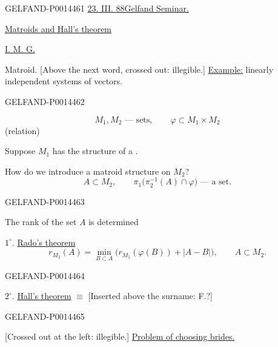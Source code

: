 \begin{GelfandAdjacentEvidence}{GELFAND-P001446}{1}
\uline{23. III. 88}\qquad\uline{Gelfand Seminar.}

\qquad\uline{Matroids and Hall’s theorem}

\uline{I. M. G.}

Matroid. [Above the next word, crossed out: illegible.] \uline{Example:} linearly independent systems of vectors.
\end{GelfandAdjacentEvidence}
\begin{GelfandAdjacentEvidence}{GELFAND-P001446}{2}

\[
M_1,M_2\text{ — sets},\qquad \varphi\subset M_1\times M_2
\]
\hfill (relation)\par

Suppose \(M_1\) has the structure of a .

How do we introduce a matroid structure on \(M_2\)?
\[
A\subset M_2,\qquad
\pi_1\bigl(\pi_2^{-1}(A)\cap\varphi\bigr)\text{ — a set}.
\]
\end{GelfandAdjacentEvidence}
\begin{GelfandAdjacentEvidence}{GELFAND-P001446}{3}


The rank of the set \(A\) is determined

\(1^\circ\). \uline{Rado’s theorem}
\[
r_{M_2}(A)=\min_{B\subset A}
\bigl(r_{M_1}(\varphi(B))+|A-B|\bigr),\qquad A\subset M_2.
\]
\end{GelfandAdjacentEvidence}
\begin{GelfandAdjacentEvidence}{GELFAND-P001446}{4}


\(2^\circ\). \uline{Hall’s theorem} \(\equiv\) [Inserted above the surname: F.?]
\end{GelfandAdjacentEvidence}
\begin{GelfandAdjacentEvidence}{GELFAND-P001446}{5}


[Crossed out at the left: illegible.] \uline{Problem of choosing brides.}
\end{GelfandAdjacentEvidence}
